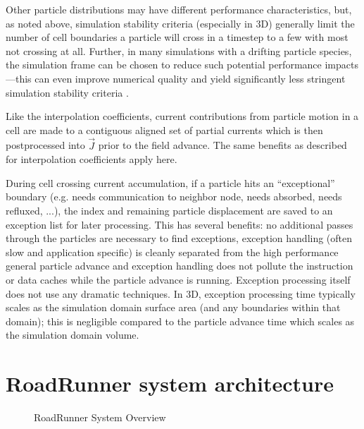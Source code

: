 \documentclass[letter,10pt]{article}
\newcommand{\vecJ}{\vec{J}}
\begin{document}
Other particle distributions may have different performance
characteristics, but, as noted above, simulation stability criteria
(especially in 3D) generally limit the number of cell boundaries a
particle will cross in a timestep to a few with most not crossing at
all.  Further, in many simulations with a drifting particle species,
the simulation frame can be chosen to reduce such potential
performance impacts---this can even improve numerical quality and
yield significantly less stringent simulation stability criteria
\cite{Vay_2007}.

Like the interpolation coefficients, current contributions from
particle motion in a cell are made to a contiguous aligned set of
partial currents which is then postprocessed into $\vecJ$ prior to the
field advance.  The same benefits as described for interpolation
coefficients apply here.

During cell crossing current accumulation, if a particle hits an
``exceptional'' boundary (e.g. needs communication to neighbor node,
needs absorbed, needs refluxed, ...), the index and remaining particle
displacement are saved to an exception list for later processing.
This has several benefits: no additional passes through the particles
are necessary to find exceptions, exception handling (often slow and
application specific) is cleanly separated from the high performance
general particle advance and exception handling does not pollute the
instruction or data caches while the particle advance is running.
Exception processing itself does not use any dramatic techniques.  In
3D, exception processing time typically scales as the simulation
domain surface area (and any boundaries within that domain); this is
negligible compared to the particle advance time which scales as the
simulation domain volume.

\section*{RoadRunner system architecture}

\begin{figure}
    \begin{center}
    \scalebox{0.3}{}
    \caption{RoadRunner System Overview}
    \label{fig:system}
    \end{center}
\end{figure}
\end{document}
